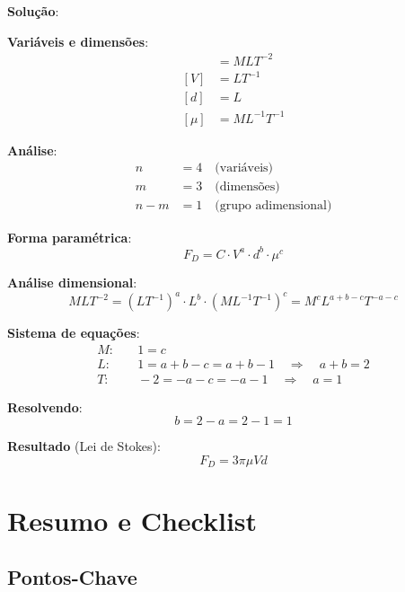 \documentclass[12pt,a4paper,oneside]{book}
\theoremstyle{definition}
\begin{document}
\textbf{Solução}:

\textbf{Variáveis e dimensões}:
\begin{align}
    [F_D] &= MLT^{-2} \\
    [V] &= LT^{-1} \\
    [d] &= L \\
    [\mu] &= ML^{-1}T^{-1}
\end{align}

\textbf{Análise}:
\begin{align}
    n &= 4 \quad \text{(variáveis)} \\
    m &= 3 \quad \text{(dimensões)} \\
    n - m &= 1 \quad \text{(grupo adimensional)}
\end{align}

\textbf{Forma paramétrica}:
\begin{equation}
    F_D = C \cdot V^a \cdot d^b \cdot \mu^c
\end{equation}

\textbf{Análise dimensional}:
\begin{equation}
    MLT^{-2} = (LT^{-1})^a \cdot L^b \cdot (ML^{-1}T^{-1})^c = M^c L^{a+b-c} T^{-a-c}
\end{equation}

\textbf{Sistema de equações}:
\begin{align}
    M: & \quad 1 = c \\
    L: & \quad 1 = a + b - c = a + b - 1 \quad \Rightarrow \quad a + b = 2 \\
    T: & \quad -2 = -a - c = -a - 1 \quad \Rightarrow \quad a = 1
\end{align}

\textbf{Resolvendo}:
\begin{equation}
    b = 2 - a = 2 - 1 = 1
\end{equation}

\textbf{Resultado} (Lei de Stokes):
\begin{equation}
    F_D = 3\pi \mu V d
\end{equation}

\section{Resumo e Checklist}

\subsection{Pontos-Chave}
\end{document}
